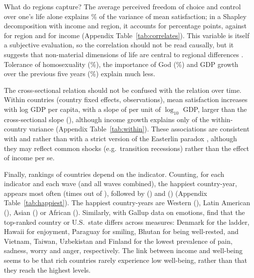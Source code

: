 \documentclass[12pt]{article}
\begin{document}
What do regions capture? The average perceived freedom of choice and control over one's life alone explains \RtwoFreedomSatisfaction\% of the variance of mean satisfaction; in a Shapley decomposition with income and region, it accounts for \shapleyFreedom percentage points, against \shapleyFreedomRegion for region and \shapleyFreedomIncome for income (Appendix Table~\ref{tab:correlates}). This variable is itself a subjective evaluation, so the correlation should not be read causally, but it suggests that non-material dimensions of life are central to regional differences \citep{inglehart_development_2008}. Tolerance of homosexuality (\RtwoTolerance\%), the importance of God (\RtwoGod\%) and GDP growth over the previous five years (\RtwoGrowth\%) explain much less.

The cross-sectional relation should not be confused with the relation over time. Within countries (country fixed effects, \nWithin observations), mean satisfaction increases with log GDP per capita, with a slope of \withinSlopeSatisfiedMean per unit of $\log_{10}$ GDP, larger than the cross-sectional slope (\crossSlopeSatisfiedMean), although income growth explains only \withinRtwoSatisfiedMean of the within-country variance (Appendix Table~\ref{tab:within}). These associations are consistent with \citet{stevenson_economic_2008} and \citet{sacks_new_2012} rather than with a strict version of the Easterlin paradox \citep{easterlin_does_1974,easterlin_happiness_2010}, although they may reflect common shocks (e.g.\ transition recessions) rather than the effect of income per se.

Finally, rankings of countries depend on the indicator. Counting, for each indicator and each wave (and all waves combined), the happiest country-year, \happiestFirst appears most often (\happiestFirstN times out of \nHappiestCells), followed by \happiestSecond (\happiestSecondN) and \happiestThird (\happiestThirdN) (Appendix Table~\ref{tab:happiest}). The happiest country-years are Western (\happiestRegionWestern), Latin American (\happiestRegionLatinAmerica), Asian (\happiestRegionAsia) or African (\happiestRegionAfrica). Similarly, with Gallup data on emotions, \citet{blanchflower_wellbeing_2024} find that the top-ranked country or U.S.\ state differs across measures: Denmark for the ladder, Hawaii for enjoyment, Paraguay for smiling, Bhutan for being well-rested, and Vietnam, Taiwan, Uzbekistan and Finland for the lowest prevalence of pain, sadness, worry and anger, respectively. The link between income and well-being seems to be that rich countries rarely experience low well-being, rather than that they reach the highest levels.
\end{document}
